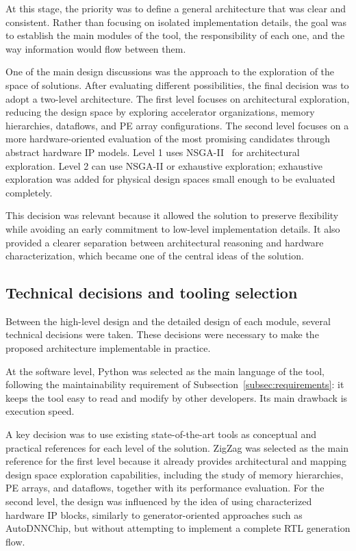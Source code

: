 At this stage, the priority was to define a general architecture that
was clear and consistent. Rather than focusing on isolated
implementation details, the goal was to establish the main modules of
the tool, the responsibility of each one, and the way information
would flow between them.

One of the main design discussions was the approach to the
exploration of the space of solutions. After evaluating different
possibilities, the final decision was to adopt a two-level
architecture. The first level focuses on architectural exploration,
reducing the design space by exploring accelerator organizations,
memory hierarchies, dataflows, and PE array configurations. The
second level focuses on a more hardware-oriented evaluation of the
most promising candidates through abstract hardware IP models. Level
1 uses NSGA-II~\cite{nsga2} for architectural exploration. Level 2 can use NSGA-II
or exhaustive exploration; exhaustive exploration was added for
physical design spaces small enough to be evaluated completely.

This decision was relevant because it allowed the solution to
preserve flexibility while avoiding an early commitment to low-level
implementation details. It also provided a clearer separation between
architectural reasoning and hardware characterization, which became
one of the central ideas of the solution.

\subsection{Technical decisions and tooling selection}
Between the high-level design and the detailed design of each module,
several technical decisions were taken. These decisions were
necessary to make the proposed architecture implementable in practice.

At the software level, Python was selected as the main language of
the tool, following the maintainability requirement of
Subsection~\ref{subsec:requirements}: it keeps the tool easy to read
and modify by other developers. Its main drawback is execution speed.

A key decision was to use existing state-of-the-art tools as
conceptual and practical references for each level of the solution.
ZigZag was selected as the main reference for the first level because
it already provides architectural and mapping design space
exploration capabilities, including the study of memory hierarchies,
PE arrays, and dataflows, together with its performance evaluation. 
For the second level, the design was
influenced by the idea of using characterized hardware IP blocks,
similarly to generator-oriented approaches such as AutoDNNChip, but
without attempting to implement a complete RTL generation flow.


